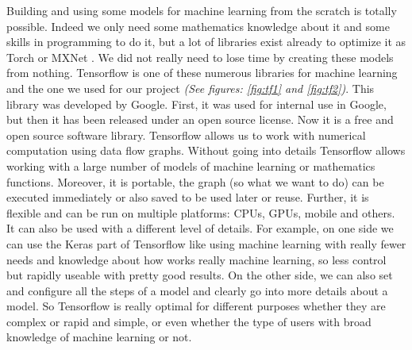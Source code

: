 \documentclass[a4]{article}
\begin{document}
Building and using some models for machine learning from the scratch is totally possible. Indeed we only need some mathematics knowledge about it and some skills in programming to do it, but a lot of libraries exist already to optimize it as Torch or MXNet \cite{varangaonkar}. We did not really need to lose time by creating these models from nothing. Tensorflow \cite{tensorflow} is one of these numerous libraries for machine learning and the one we used for our project \textit{(See figures: \ref{fig:tf1} and \ref{fig:tf2})}. This library was developed by Google. First, it was used for internal use in Google, but then it has been released under an open source license. Now it is a free and open source software library. Tensorflow allows us to work with numerical computation using data flow graphs. Without going into details Tensorflow allows working with a large number of models of machine learning or mathematics functions. Moreover, it is portable, the graph (so what we want to do) can be executed immediately or also saved to be used later or reuse. Further, it is flexible and can be run on multiple platforms: CPUs, GPUs, mobile and others. It can also be used with a different level of details. For example, on one side we can use the Keras part of Tensorflow like using machine learning with really fewer needs and knowledge about how works really machine learning, so less control but rapidly useable with pretty good results. On the other side, we can also set and configure all the steps of a model and clearly go into more details about a model. So Tensorflow is really optimal for different purposes whether they are complex or rapid and simple, or even whether the type of users with broad knowledge of machine learning or not.
\end{document}
